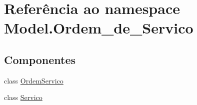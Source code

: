 \hypertarget{namespace_model_1_1_ordem__de___servico}{}\section{Referência ao namespace Model.\+Ordem\+\_\+de\+\_\+\+Servico}
\label{namespace_model_1_1_ordem__de___servico}
\subsection*{Componentes}
\begin{DoxyCompactItemize}
\item 
class \hyperlink{class_model_1_1_ordem__de___servico_1_1_ordem_servico}{Ordem\+Servico}
\item 
class \hyperlink{class_model_1_1_ordem__de___servico_1_1_servico}{Servico}
\end{DoxyCompactItemize}
